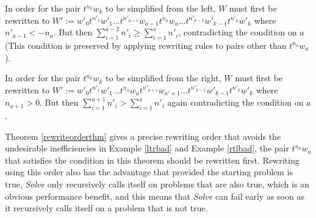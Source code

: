 \documentclass[11pt]{article} %
\theoremstyle{definition}
\theoremstyle{definition}
\theoremstyle{definition}
\theoremstyle{definition}
\theoremstyle{definition}
\theoremstyle{definition}
\newtheorem{exmpl}{Example}[theorem]
\begin{document}
In order for the pair $t^{n_k}w_k$ to be simplified from the left,
$W$ must first be rewritten to
$W' := w'_0t^{n'_1}w'_1 \dots t^{n'_{a-1}}w_{a-1}t^{n_a}w_a \dots
t^{n'_{k-1}}w'_{k-1}t^{n'_k}w'_k$ where $n'_{a-1} < -n_a$. But then
$\sum_{i=1}^{a-2} n'_i \ge \sum_{i=1}^a n'_i$, contradicting the condition
on $a$ (This condition is preserved by applying rewriting rules to pairs other
than $t^{n_a}w_a$).

In order for the pair $t^{n_k}w_k$ to be simplified from the right, $W$ must first
be rewritten to $W' := w'_0t^{n'_1}w'_1 \dots t^{n_a}w_a t^{n'_{a+1}}w_{a'+1} \dots
t^{n'_{k-1}}w'_{k-1}t^{n'_k}w'_k$ where $n_{a+1} > 0$. But then
$\sum_{i=1}^{a+1} n'_i > \sum_{i=1}^a n'_i$ again contradicting the condition on $a$.

Theorem \ref{rewriteorderthm} gives a precise rewriting order that avoids the undesirable
inefficiencies in Example \ref{ltrbad} and Example \ref{rtlbad}, the
pair $t^{n_a}w_a$ that satisfies the condition in this theorem should be rewritten first.
Rewriting using this order also has the advantage that provided the starting problem
is true, \textit{Solve} only recursively calls itself on problems that are also true, which
is an obvious performance benefit, and this means that \textit{Solve} can fail early
as soon as it recursively calls itself on a problem that is not true.




\end{document}
